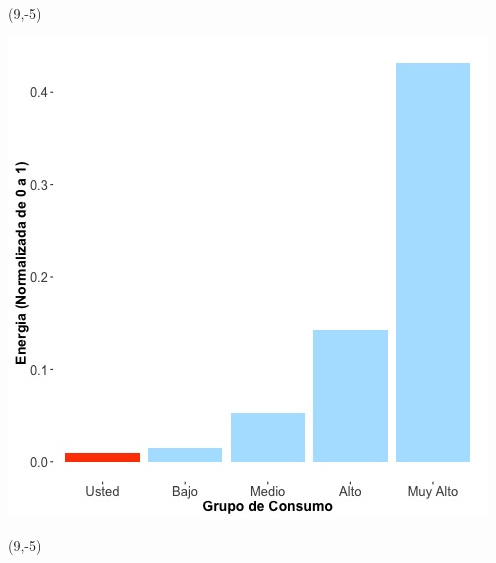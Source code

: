 \documentclass{article}\usepackage[]{graphicx}\usepackage[]{color}
\newenvironment{knitrout}{}{} %
\begin{document}
 \begin{textblock}{1}(9,-5)
\begin{minipage}{20em}
\begingroup

\endgroup
\end{minipage}
\end{textblock}


\begin{knitrout}
\color{fgcolor}
\includegraphics[scale=0.65]{figure/A12_neighbor_plot} 
\end{knitrout}

 \begin{textblock}{1}(9,-5)
\begin{minipage}{20em}
\begingroup

\endgroup
\end{minipage}
\end{textblock}
\end{document}
